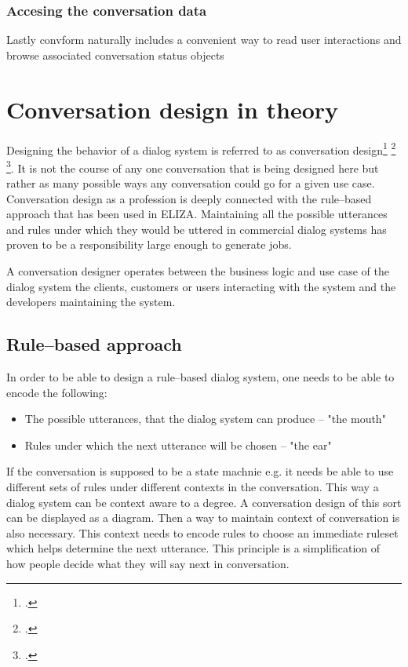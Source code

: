 \documentclass[12pt]{report}
\begin{document}
{\subsubsection{Accesing the conversation data}
Lastly convform naturally includes a convenient way to read user interactions
and browse associated conversation status objects

\section{Conversation design in theory}


\par
Designing the behavior of a dialog system
is referred to as conversation design\footcite{kolosova2022} \footcite{mctear2020conversational} \footcite{cxd}.
It is not the course of any one conversation that is being designed here
but rather as many possible ways any conversation could go
for a given use case.
Conversation design as a profession is deeply connected
with the rule–based approach that has been used in ELIZA.
Maintaining all the possible utterances and
rules under which they would be uttered
in commercial dialog systems
has proven to be a responsibility large enough
to generate jobs.

A conversation designer operates between
the business logic and use case of the dialog system
the clients, customers or users interacting with the system
and the developers maintaining the system.

\subsection{Rule–based approach}

In order to be able to design a rule–based dialog system,
one needs to be able to encode the following:

    \begin{itemize}

        \item
        The possible utterances, that the dialog system can produce – "the mouth"

        \item
        Rules under which the next utterance will be chosen – "the ear"

    \end{itemize}

\par
If the conversation is supposed to be a state machnie e.g.
it needs be able to use different sets of rules
under different contexts in the conversation.
This way a dialog system can be context aware to a degree.
A conversation design of this sort
can be displayed as a diagram.
Then a way to maintain context of conversation is also necessary.
This context needs to encode rules to choose an immediate ruleset
which helps determine the next utterance.
This principle is a simplification of
how people decide what they will say next in conversation.

}
\end{document}
